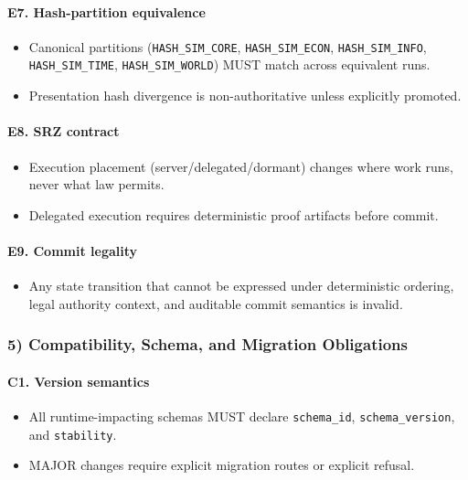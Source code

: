 \documentclass[9pt,a4paper,openany]{book}
\begin{document}
\paragraph{E7. Hash-partition equivalence}
\begin{itemize}
\item Canonical partitions (\texttt{HASH\_\allowbreak{}SIM\_\allowbreak{}CORE}, \texttt{HASH\_\allowbreak{}SIM\_\allowbreak{}ECON}, \texttt{HASH\_\allowbreak{}SIM\_\allowbreak{}INFO}, \texttt{HASH\_\allowbreak{}SIM\_\allowbreak{}TIME}, \texttt{HASH\_\allowbreak{}SIM\_\allowbreak{}WORLD}) MUST match across equivalent runs.\allowbreak{}
\item Presentation hash divergence is non-\allowbreak{}authoritative unless explicitly promoted.\allowbreak{}
\end{itemize}

\paragraph{E8. SRZ contract}
\begin{itemize}
\item Execution placement (server/\allowbreak{}delegated/\allowbreak{}dormant) changes where work runs, never what law permits.\allowbreak{}
\item Delegated execution requires deterministic proof artifacts before commit.\allowbreak{}
\end{itemize}

\paragraph{E9. Commit legality}
\begin{itemize}
\item Any state transition that cannot be expressed under deterministic ordering, legal authority context, and auditable commit semantics is invalid.\allowbreak{}
\end{itemize}

\subsubsection{5) Compatibility, Schema, and Migration Obligations}

\paragraph{C1. Version semantics}
\begin{itemize}
\item All runtime-\allowbreak{}impacting schemas MUST declare \texttt{schema\_\allowbreak{}id}, \texttt{schema\_\allowbreak{}version}, and \texttt{stability}.\allowbreak{}
\item MAJOR changes require explicit migration routes or explicit refusal.\allowbreak{}
\end{itemize}
\end{document}
